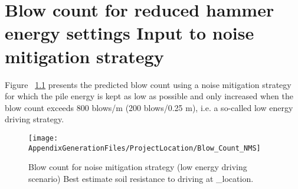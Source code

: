 \chapter{Blow count for reduced hammer energy settings Input to noise mitigation strategy}\label{sec_1}

Figure ~\ref{blow_count_Noise} presents the predicted blow count using a noise mitigation strategy
for which the pile energy is kept as low as possible and only increased when the
blow count exceeds 800 blows/m (200 blows/0.25 m), i.e. a so-called low
energy driving strategy.


\begin{figure}[!htbp]
\texttt{[image: AppendixGenerationFiles/ProjectLocation/Blow\_Count\_NMS]}
\caption{Blow count for noise mitigation strategy (low energy driving scenario) Best estimate soil resistance to driving at  {\ID_location}.}
\label{blow_count_Noise}\end{figure}

\newpage



